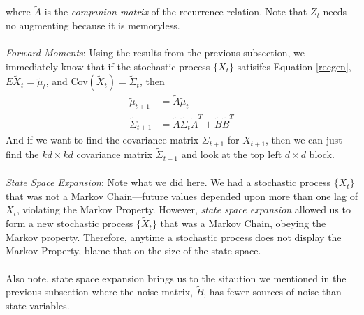 \documentclass[12pt]{article}
\theoremstyle{plain}
\theoremstyle{definition}
\theoremstyle{remark}
\begin{document}
where $\tilde{A}$ is the \emph{companion matrix} of the
recurrence relation.
Note that ${Z}_t$ needs no augmenting because it is memoryless.
\\
\\
{\sl Forward Moments}: Using the results from the previous
subsection, we immediately know that if the stochastic process
$\{{X}_t\}$ satisifes Equation \ref{recgen},
$E\tilde{{X}}_t = \tilde{\mu}_t$, and
Cov$(\tilde{{X}}_t) = \tilde{\Sigma}_t$, then
\begin{align*}
    \tilde{\mu}_{t+1} &= \tilde{A}\tilde{\mu}_t \\
    \tilde{\Sigma}_{t+1} &= \tilde{A} \tilde{\Sigma}_t\tilde{A}^T +
	\tilde{B} \tilde{B}^T
\end{align*}
And if we want to find the covariance matrix $\Sigma_{t+1}$ for
${X}_{t+1}$, then we can just find the $kd \times kd$
covariance matrix $\tilde{\Sigma}_{t+1}$ and look at the top left
$d\times d$ block.
\\
\\
{\sl State Space Expansion}: Note what we did here.  We had a
stochastic process $\{{X}_{t}\}$ that was not a Markov
Chain---future values depended upon more than one lag of
${X}_t$, violating the Markov Property.  However,
\emph{state space expansion} allowed us to form a new stochastic
process $\{\tilde{{X}}_t\}$ that was a Markov Chain, obeying
the Markov property.  Therefore, anytime a stochastic process
does not display the Markov Property, blame that on the size of
the state space.
\\
\\
Also note, state space expansion brings us to the sitaution we
mentioned in the previous subsection where the noise matrix,
$\tilde{B}$, has fewer sources of noise than state variables.


\clearpage
\end{document}
